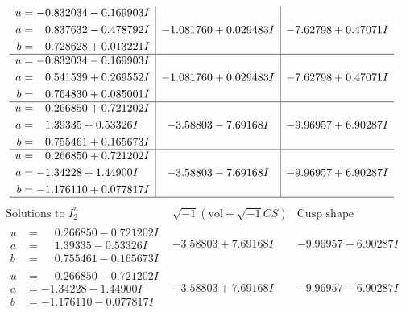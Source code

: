 \documentclass[1p]{elsarticle_modified}
\theoremstyle{definition}
\newcommand{\I}{\sqrt{-1}}
\begin{document}
$$\begin{array}{c|c|c}
\begin{aligned}
u &= -0.832034 - 0.169903 I \\
a &= \phantom{-}0.837632 - 0.478792 I \\
b &= \phantom{-}0.728628 + 0.013221 I\end{aligned}
 & -1.081760 + 0.029483 I & -7.62798 + 0.47071 I \\ \hline\begin{aligned}
u &= -0.832034 - 0.169903 I \\
a &= \phantom{-}0.541539 + 0.269552 I \\
b &= \phantom{-}0.764830 + 0.085001 I\end{aligned}
 & -1.081760 + 0.029483 I & -7.62798 + 0.47071 I \\ \hline\begin{aligned}
u &= \phantom{-}0.266850 + 0.721202 I \\
a &= \phantom{-}1.39335 + 0.53326 I \\
b &= \phantom{-}0.755461 + 0.165673 I\end{aligned}
 & -3.58803 - 7.69168 I & -9.96957 + 6.90287 I \\ \hline\begin{aligned}
u &= \phantom{-}0.266850 + 0.721202 I \\
a &= -1.34228 + 1.44900 I \\
b &= -1.176110 + 0.077817 I\end{aligned}
 & -3.58803 - 7.69168 I & -9.96957 + 6.90287 I\\
 \hline 
 \end{array}$$\newpage$$\begin{array}{c|c|c}  
\text{Solutions to }I^u_{2}& \I (\text{vol} + \sqrt{-1}CS) & \text{Cusp shape}\\
 \hline 
\begin{aligned}
u &= \phantom{-}0.266850 - 0.721202 I \\
a &= \phantom{-}1.39335 - 0.53326 I \\
b &= \phantom{-}0.755461 - 0.165673 I\end{aligned}
 & -3.58803 + 7.69168 I & -9.96957 - 6.90287 I \\ \hline\begin{aligned}
u &= \phantom{-}0.266850 - 0.721202 I \\
a &= -1.34228 - 1.44900 I \\
b &= -1.176110 - 0.077817 I\end{aligned}
 & -3.58803 + 7.69168 I & -9.96957 - 6.90287 I \\ \hline\begin{aligned}

\end{aligned}
\end{array}$$
\end{document}
